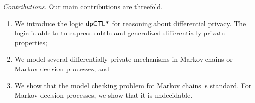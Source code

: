 \noindent
\emph{Contributions.} Our main contributions are threefold. 
\begin{enumerate}
\item We introduce the logic $\textsf{dpCTL*}$ for reasoning about 
differential privacy. The logic is able to to express subtle and generalized
differentially private properties;
\item We model several differentially private mechanisms in Markov chains or Markov decision processes; and
\item We show that the model checking
problem for Markov chains is standard. For Markov decision processes, we show that it is undecidable.
\end{enumerate}
